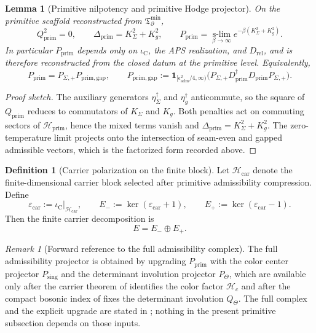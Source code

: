 \documentclass[11pt,a4paper]{article}
\newtheorem{lemma}[theorem]{Lemma}
\theoremstyle{definition}
\newtheorem{definition}[theorem]{Definition}
\theoremstyle{remark}
\newtheorem*{remark}{Remark}
\newcommand{\Seam}{\Sigma}
\newcommand{\iC}{\iota_{\mathrm C}}
\newcommand{\epscar}{\varepsilon_{\mathrm{car}}}
\newcommand{\Tbound}{\mathfrak T_{\partial}^{\min}}
\newcommand{\Pprim}{P_{\mathrm{prim}}}
\begin{document}
\begin{lemma}[Primitive nilpotency and primitive Hodge projector]
\label{lem:admissibility-nilpotency}
\label{lem:hodge-admissibility-projector}
\label{lem:primitive-admissibility-nilpotency}
On the primitive scaffold reconstructed from $\Tbound$,
\[
Q_{\mathrm{prim}}^2=0,
\qquad
\Delta_{\mathrm{prim}}
=
K_\Sigma^2+K_g^2,
\qquad
\Pprim
=
\operatorname*{s-lim}_{\beta\to\infty}e^{-\beta(K_\Sigma^2+K_g^2)}.
\]
In particular $\Pprim$ depends only on $\iC$, the APS realization, and $D_{\mathrm{rel}}$, and
is therefore reconstructed from the closed datum at the primitive level. Equivalently,
\[
\Pprim=P_{\Seam,+}P_{\mathrm{prim,gap}},
\qquad
P_{\mathrm{prim,gap}}
:=
\mathbf 1_{[\epsilon_{\mathrm{adm}}^2/4,\infty)}
\!\bigl(P_{\Seam,+}D_{\mathrm{prim}}^\dagger D_{\mathrm{prim}}P_{\Seam,+}\bigr).
\]
\end{lemma}

\begin{proof}[Proof sketch]
The auxiliary generators $\eta_\Sigma^\dagger$ and $\eta_g^\dagger$ anticommute, so the square
of $Q_{\mathrm{prim}}$ reduces to commutators of $K_\Sigma$ and $K_g$. Both penalties act on
commuting sectors of $\mathcal H_{\mathrm{prim}}$, hence the mixed terms vanish and
$\Delta_{\mathrm{prim}}=K_\Sigma^2+K_g^2$. The zero-temperature limit projects onto the
intersection of seam-even and gapped admissible vectors, which is the factorized form recorded
above.
\end{proof}

\begin{definition}[Carrier polarization on the finite block]
\label{def:carrier-polarization-involution}
Let $\mathcal H_{\mathrm{car}}$ denote the finite-dimensional carrier block selected after
primitive admissibility compression. Define
\[
\epscar:=\iC|_{\mathcal H_{\mathrm{car}}},
\qquad
E_-:=\ker(\epscar+1),
\qquad
E_+:=\ker(\epscar-1).
\]
Then the finite carrier decomposition is
\[
E=E_-\oplus E_+.
\]
\end{definition}

\begin{remark}[Forward reference to the full admissibility complex]
\label{rem:forward-Padm}
The full admissibility projector is obtained by upgrading $\Pprim$ with the color center
projector $P_{\mathrm{sing}}$ and the determinant involution projector $P_\Theta$, which are
available only after the carrier theorem of  identifies the
color factor $\mathcal H_c$ and after the compact bosonic index of 
fixes the determinant involution $Q_\Theta$. The full complex and the explicit upgrade are
stated in ; nothing in the present
primitive subsection depends on those inputs.
\end{remark}
\end{document}

